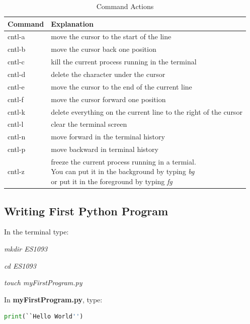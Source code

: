 \documentclass[12pt]{article}
\begin{document}
\begin{table}[h]
  \centering
  \begin{tabular}{| l | l | }
    \hline
    \textbf{Command} & \textbf{Explanation} \\ \hline
    cntl-a & move the cursor to the start of the line \\ \hline
    cntl-b & move the cursor back one position \\ \hline
    cntl-c & kill the current process running in the terminal \\ \hline
    cntl-d & delete the character under the cursor \\ \hline
    cntl-e & move the cursor to the end of the current line \\ \hline
    cntl-f & move the cursor forward one position \\ \hline
    cntl-k & delete everything on the current line to the right of the cursor \\ \hline
    cntl-l & clear the terminal screen \\ \hline
    cntl-n & move forward in the terminal history \\ \hline
    cntl-p & move backward in terminal history \\ \hline
    cntl-z & \shortstack[l]{freeze the current process running in a termial. \\ You can put it in the background by typing \textit{bg} \\or put it in the foreground by typing \textit{fg}}\\ \hline
  \end{tabular}
  \caption{Command Actions}
  \label{table:command_action}
\end{table}



\subsection{Writing First Python Program}
In the terminal type:

\vspace{5mm}
  \textit{mkdir ES1093}
  
  \textit{cd ES1093}
  
  \textit{touch myFirstProgram.py}
  
\vspace{5mm}


In \textbf{myFirstProgram.py}, type:
\begin{lstlisting}[language=Python]
print(``Hello World'')
\end{lstlisting}
\end{document}
